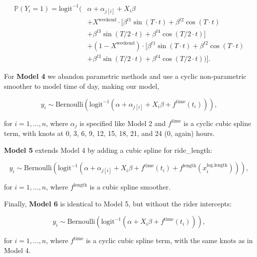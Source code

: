 \documentclass[]{article}
\begin{document}
\begin{equation}
\begin{split}
\mathbb{P} (Y_i=1) = \text{logit}^{-1} (&\alpha + \alpha_{j[i]} + X_i \beta \\
&+ X^\text{weekend} \cdot [\beta^{t1} \sin(T \cdot t) + \beta^{t2} \cos (T \cdot t)\\
&+ \beta^{t3} \sin(T/2 \cdot t) + \beta^{t4} \cos (T/2 \cdot t)]\\
&+ (1 - X^\text{weekend}) \cdot [\beta^{t1} \sin(T \cdot t) + \beta^{t2} \cos (T \cdot t)\\
&+ \beta^{t3} \sin(T/2 \cdot t) + \beta^{t4} \cos (T/2 \cdot t))].
\end{split}
\end{equation}

For \textbf{Model 4} we abandon parametric methods and use a cyclic
non-parametric smoother to model time of day, making our model,

\begin{equation}
y_i \sim \text{Bernoulli} \left(
\text{logit}^{-1} \left( \alpha + \alpha_{j[i]} + X_i \beta + 
f^\text{time} (t_i)  \right)
\right),
\end{equation}

for \(i = 1, \ldots, n\), where \(\alpha_j\) is specified like Model 2
and \(f^\text{time}\) is a cyclic cubic spline term, with knots at 0, 3,
6, 9, 12, 15, 18, 21, and 24 (0, again) hours.

\textbf{Model 5} extends Model 4 by adding a cubic spline for
ride\_length:

\begin{equation}
y_i \sim \text{Bernoulli} \left(
\text{logit}^{-1} \left( \alpha + \alpha_{j[i]} + X_i \beta + 
f^\text{time} (t_i) + f^\text{length} (x^\text{log.length}_i)  \right)
\right),
\end{equation}

for \(i = 1, \ldots, n\), where \(f^\text{length}\) is a cubic spline
smoother.

Finally, \textbf{Model 6} is identical to Model 5, but without the rider
intercepts:

\begin{equation}
y_i \sim \text{Bernoulli} \left(
\text{logit}^{-1} \left( \alpha + X_i \beta + 
f^\text{time} (t_i)  \right)
\right),
\end{equation}

for \(i = 1, \ldots, n\), where \(f^\text{time}\) is a cyclic cubic
spline term, with the same knots as in Model 4.
\end{document}
